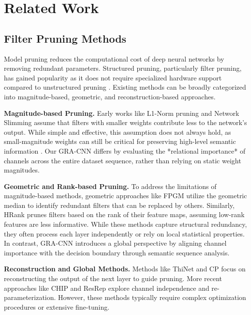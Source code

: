\section{Related Work}

\subsection{Filter Pruning Methods}
Model pruning reduces the computational cost of deep neural networks by removing redundant parameters. Structured pruning, particularly filter pruning, has gained popularity as it does not require specialized hardware support compared to unstructured pruning \citep{han2015deep}. Existing methods can be broadly categorized into magnitude-based, geometric, and reconstruction-based approaches.

\textbf{Magnitude-based Pruning.} Early works like L1-Norm pruning \citep{li2016pruning} and Network Slimming \citep{liu2017learning} assume that filters with smaller weights contribute less to the network's output. While simple and effective, this assumption does not always hold, as small-magnitude weights can still be critical for preserving high-level semantic information \citep{he2019filter}. Our GRA-CNN differs by evaluating the *relational importance* of channels across the entire dataset sequence, rather than relying on static weight magnitudes.

\textbf{Geometric and Rank-based Pruning.} To address the limitations of magnitude-based methods, geometric approaches like FPGM \citep{he2019filter} utilize the geometric median to identify redundant filters that can be replaced by others. Similarly, HRank \citep{lin2020hrank} prunes filters based on the rank of their feature maps, assuming low-rank features are less informative. While these methods capture structural redundancy, they often process each layer independently or rely on local statistical properties. In contrast, GRA-CNN introduces a global perspective by aligning channel importance with the decision boundary through semantic sequence analysis.

\textbf{Reconstruction and Global Methods.} Methods like ThiNet \citep{luo2017thinet} and CP \citep{he2017channel} focus on reconstructing the output of the next layer to guide pruning. More recent approaches like CHIP \citep{sui2021chip} and ResRep \citep{ding2021resrep} explore channel independence and re-parameterization. However, these methods typically require complex optimization procedures or extensive fine-tuning.

